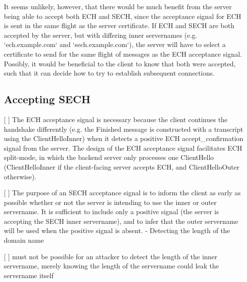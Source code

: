 It seems unlikely, however, that there would be much benefit from the server being able to accept both ECH and SECH, since the acceptance signal for ECH is sent in the same flight as the server certificate. If ECH and SECH are both accepted by the server, but with differing inner servernames (e.g. `ech.example.com` and `sech.example.com`), the server will have to select a certificate to send for the same flight of messages as the ECH acceptance signal. Possibly, it would be beneficial to the client to know that both were accepted, such that it can decide how to try to establish subsequent connections. 

\subsection{Accepting SECH}

[ ]  The ECH acceptance signal is necessary because the client continues the handshake differently (e.g. the Finished message is constructed with a transcript using the ClientHelloInner) when it detects a positive ECH accept_confirmation signal from the server. The design of the ECH acceptance signal facilitates ECH split-mode, in which the backend server only processes one ClientHello (ClientHelloInner if the client-facing server accepts ECH, and ClientHelloOuter otherwise).

[ ] The purpose of an SECH acceptance signal is to inform the client as early as possible whether or not the server is intending to use the inner or outer servername. It is sufficient to include only a positive signal (the server is accepting the SECH inner servername), and to infer that the outer servername will be used when the positive signal is absent.
    - Detecting the length of the domain name

[ ] must not be possible for an attacker to detect the length of the inner servername, merely knowing the length of the servername could leak the servername itself
